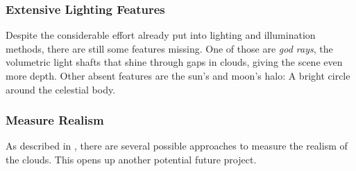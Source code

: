 \subsubsection{Extensive Lighting Features}
Despite the considerable effort already put into lighting and illumination methods, there are still some features missing. One of those are \textit{god rays}, the volumetric light shafts that shine through gaps in clouds, giving the scene even more depth.
Other absent features are the sun's and moon's halo: A bright circle around the celestial body.

\subsubsection{Measure Realism}
As described in , there are several possible approaches to measure the realism of the clouds. This opens up another potential future project.